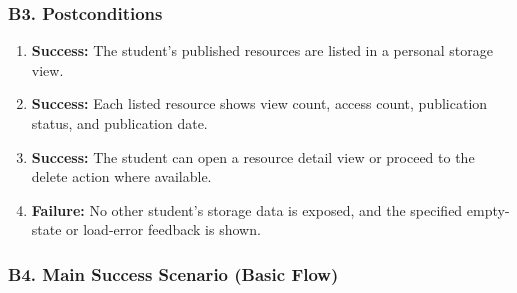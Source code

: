 \documentclass[12pt]{article}
\begin{document}
\hypertarget{sec:b3-postconditions}{}
\subsubsection*{B3. Postconditions}
\par\medskip

\begin{enumerate}
\item \textbf{Success:} The student's published resources are listed in a personal storage view.
\item \textbf{Success:} Each listed resource shows view count, access count, publication status, and publication date.
\item \textbf{Success:} The student can open a resource detail view or proceed to the delete action where available.
\item \textbf{Failure:} No other student's storage data is exposed, and the specified empty-state or load-error feedback is shown.
\end{enumerate}
\par\medskip

\hypertarget{sec:b4-main-success-scenario-basic-flow}{}
\subsubsection*{B4. Main Success Scenario (Basic Flow)}
\par\medskip
\end{document}
